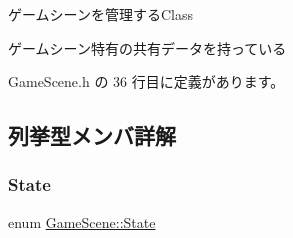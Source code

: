 ゲームシーンを管理する\+Class

ゲームシーン特有の共有データを持っている 

 Game\+Scene.\+h の 36 行目に定義があります。



\subsection{列挙型メンバ詳解}
\mbox{\label{class_game_scene_a36a51763487e2f01ced6dd8eb2dd463f}} 
\subsubsection{\texorpdfstring{State}{State}}
{\footnotesize\ttfamily enum \mbox{\hyperlink{class_game_scene_a36a51763487e2f01ced6dd8eb2dd463f}{Game\+Scene\+::\+State}}\hspace{0.3cm}{\ttfamily [strong]}}

